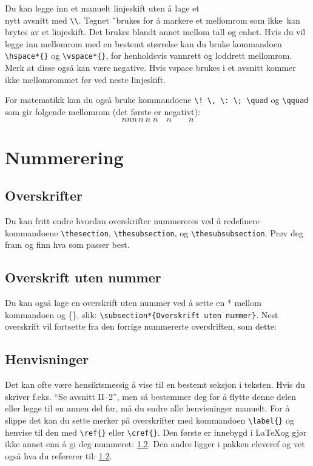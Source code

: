 Du kan legge inn et manuelt linjeskift uten å lage et \\ nytt avsnitt med \lstinline$\\$.
Tegnet \~\ brukes for å markere et mellomrom som ikke~kan brytes av et linjeskift.
Det brukes blandt annet mellom tall og enhet.
Hvis du vil legge inn mellomrom med en bestemt størrelse kan du bruke kommandoen 
\lstinline$\hspace*{}$ og \lstinline$\vspace*{}$, for henholdsvis vannrett og loddrett
mellomrom. Merk at disse også kan være negative. \vspace*{0.5cm}
Hvis vspace brukes i et avsnitt  kommer \hspace{1cm} ikke mellomrommet før ved neste linjeskift.

For matematikk kan du også bruke kommandoene
\lstinline$\! \, \: \; \quad$ og \lstinline$\qquad$ som gir folgende mellomrom (det første er negativt):
\[
	n \! nn \, n \: n \; n \quad n \qquad n
\]

\section{Nummerering}

\lstset{language=tex} %

\subsection{Overskrifter}

Du kan fritt endre hvordan overskrifter nummereres ved å redefinere kommandoene
\lstinline$\thesection$, \lstinline$\thesubsection$, og \lstinline$\thesubsubsection$.
Prøv deg fram og finn hva som passer best.

\subsection*{Overskrift uten nummer}
Du kan også lage en overskrift uten nummer ved å sette en * mellom kommandoen og \{\}, slik:
\lstinline$\subsection*{Overskrift uten nummer}$.
Nest overskrift vil fortsette fra den forrige nummererte overslriften, som dette:

\subsection{Henvisninger}\label{ov:henvisninger}
Det kan ofte være hensiktsmessig å vise til en bestemt seksjon i teksten. Hvis du skriver
f.eks. ``Se avsnitt II--2'', men så bestemmer deg for å flytte denne delen eller legge til
en annen del før, må du endre alle henvisninger manuelt.
For å slippe det kan du sette merker på overskrifter med kommandoen \lstinline$\label{}$
og henvise til den med \lstinline$\ref{}$ eller \lstinline$\cref{}$. Den første er
innebygd i \LaTeX og gjør ikke annet enn å gi deg nummeret: \ref{ov:henvisninger}.
Den andre ligger i pakken cleveref og vet også hva du refererer til: \cref{ov:henvisninger}.


